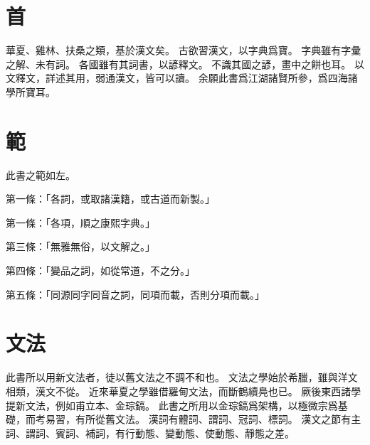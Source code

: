 \section{首}
華夏、雞林、扶桑之類，基於漢文矣。
古欲習漢文，以字典爲寶。
字典雖有字彙之解、未有詞。
各國雖有其詞書，以諺釋文。
不識其國之諺，畫中之餅也耳。
以文釋文，詳述其用，弱通漢文，皆可以讀。
余願此書爲江湖諸賢所參，爲四海諸學所寶耳。
\section{範}
此書之範如左。
\par 第一條：「各詞，或取諸漢籍，或古道而新製。」
\par 第一條：「各項，順之康熙字典。」
\par 第三條：「無雅無俗，以文解之。」
\par 第四條：「變品之詞，如從常道，不之分。」
\par 第五條：「同源同字同音之詞，同項而載，否則分項而載。」
\section{文法}
此書所以用新文法者，徒以舊文法之不調不和也。
文法之學始於希臘，雖與洋文相類，漢文不從。
近來華夏之學雖借羅甸文法，而斷鶴續鳧也已。
厥後東西諸學提新文法，例如甫立本、金琮鎬。
此書之所用以金琮鎬爲架構，以極微宗爲基礎，而考易習，有所從舊文法。
漢詞有體詞、謂詞、冠詞、標詞。
漢文之節有主詞、謂詞、賓詞、補詞，有行動態、變動態、使動態、靜態之差。
